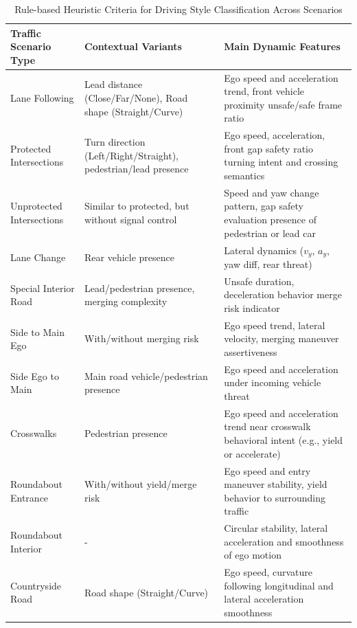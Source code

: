 \documentclass{article}
\begin{document}
\begin{table}[ht]
\centering
\caption{Rule-based Heuristic Criteria for Driving Style Classification Across Scenarios}
\label{tab:style-rule-summary}
\begin{tabular}{p{2.5cm} p{4cm} p{6.5cm}}
\toprule
\textbf{Traffic Scenario Type} & \textbf{Contextual Variants} & \textbf{Main Dynamic Features} \\
\midrule
Lane Following & Lead distance (Close/Far/None), Road shape (Straight/Curve) & Ego speed and acceleration trend, front vehicle proximity \newline unsafe/safe frame ratio \\
\midrule
Protected Intersections & Turn direction (Left/Right/Straight), pedestrian/lead presence & Ego speed, acceleration, front gap safety ratio \newline turning intent and crossing semantics \\
\midrule
Unprotected Intersections & Similar to protected, but without signal control & Speed and yaw change pattern, gap safety evaluation \newline presence of pedestrian or lead car \\
\midrule
Lane Change & Rear vehicle presence & Lateral dynamics ($v_y$, $a_y$, yaw diff, rear threat) \\
\midrule
Special Interior Road & Lead/pedestrian presence, merging complexity & Unsafe duration, deceleration behavior \newline merge risk indicator \\
\midrule
Side to Main Ego & With/without merging risk & Ego speed trend, lateral velocity, merging maneuver assertiveness \\
\midrule
Side Ego to Main & Main road vehicle/pedestrian presence & Ego speed and acceleration under incoming vehicle threat \\
\midrule
Crosswalks & Pedestrian presence & Ego speed and acceleration trend near crosswalk \newline behavioral intent (e.g., yield or accelerate) \\
\midrule
Roundabout Entrance & With/without yield/merge risk & Ego speed and entry maneuver stability, \newline yield behavior to surrounding traffic \\
\midrule
Roundabout Interior & - & Circular stability, lateral acceleration and smoothness of ego motion \\
\midrule
Countryside Road & Road shape (Straight/Curve) & Ego speed, curvature following \newline longitudinal and lateral acceleration smoothness \\
\bottomrule
\end{tabular}
\end{table}
\end{document}
